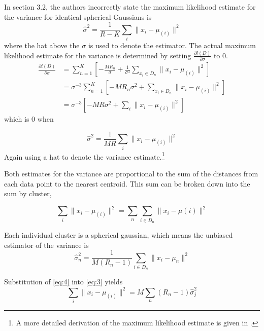 \documentclass[letterpaper]{article}
\begin{document}
In \cite{Pelleg2000} section 3.2, the authors incorrectly state the
maximum likelihood estimate for the variance for identical spherical
Gaussians is 
\begin{equation}
  \label{eq:20}
  \hat{\sigma}^2 = \frac{1}{R-K}\sum_{i} \| x_i - \mu_{(i)} \|^2
\end{equation}
where the hat above the $\sigma$ is used to denote the estimator.  The
actual maximum likelihood estimate for the variance is determined by
setting $\frac{\partial l(D)}{\partial \sigma}$ to 0.
\begin{align}
  \frac{\partial l(D)}{\partial \sigma} 
    &= \sum_{n=1}^K \left[ - \frac{M R_n}{\sigma}
       + \frac{1}{\sigma^3} \sum_{x_i \in D_n} \|x_i - \mu_{(i)}\|^2 \right] \nonumber \\
    &= \sigma^{-3} \sum_{n=1}^K \left[ -M R_n\sigma^2
       + \sum_{x_i \in D_n} \|x_i - \mu_{(i)}\|^2 \right] \nonumber \\
  \label{eq:21}
    &= \sigma^{-3} \left[ -M R \sigma^2
       + \sum_i \|x_i - \mu_{(i)}\|^2 \right]
\end{align}
which is 0 when

\begin{equation}
  \label{eq:19}
  \hat{\sigma}^2 = \frac{1}{M R} \sum_{i} \|x_i - \mu_{(i)} \|^2
\end{equation}
Again using a hat to denote the variance estimate.\footnote{A more
  detailed derivation of the maximum likelihood estimate is given in
  \cite{DaumeIII2009}.}

Both estimates for the variance are proportional to the sum of the distances
from each data point to the nearest centroid.  This sum can be broken
down into the sum by cluster,

\begin{equation}
  \label{eq:3}
  \sum_i \|x_i - \mu_{(i)}\|^2 = \sum_n \sum_{i \in D_n} \|x_i - \mu{(i)} \|^2
\end{equation}

Each individual cluster is a spherical gaussian, which means
the unbiased estimator of the variance is
\begin{equation}
  \label{eq:4}
  \hat{\sigma}_n^2 = \frac{1}{M(R_n-1)}\sum_{i \in D_n} \| x_i - \mu_n \|^2
\end{equation}

Substitution of \eqref{eq:4} into \eqref{eq:3} yields
\begin{equation}
  \label{eq:5}
  \sum_i \|x_i - \mu_{(i)}\|^2 = M \sum_n \left(R_n-1 \right) \hat\sigma_j^2
\end{equation}
\end{document}
